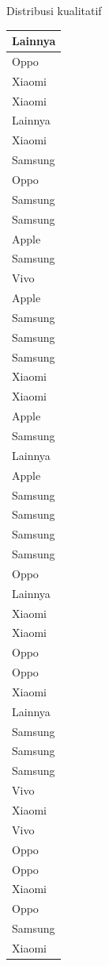\documentclass[
  ignorenonframetext,
]{beamer}
\begin{document}
\begin{frame}[s]{Distribusi kualitatif}
\begin{table}
\begin{tabular}[t]{l}
\hline
Lainnya\\
\hline
Oppo\\
\hline
Xiaomi\\
\hline
Xiaomi\\
\hline
Lainnya\\
\hline
Xiaomi\\
\hline
Samsung\\
\hline
Oppo\\
\hline
Samsung\\
\hline
Samsung\\
\hline
Apple\\
\hline
Samsung\\
\hline
Vivo\\
\hline
Apple\\
\hline
Samsung\\
\hline
Samsung\\
\hline
Samsung\\
\hline
Xiaomi\\
\hline
Xiaomi\\
\hline
Apple\\
\hline
Samsung\\
\hline
Lainnya\\
\hline
Apple\\
\hline
Samsung\\
\hline
Samsung\\
\hline
Samsung\\
\hline
Samsung\\
\hline
Oppo\\
\hline
Lainnya\\
\hline
Xiaomi\\
\hline
Xiaomi\\
\hline
Oppo\\
\hline
Oppo\\
\hline
Xiaomi\\
\hline
Lainnya\\
\hline
Samsung\\
\hline
Samsung\\
\hline
Samsung\\
\hline
Vivo\\
\hline
Xiaomi\\
\hline
Vivo\\
\hline
Oppo\\
\hline
Oppo\\
\hline
Xiaomi\\
\hline
Oppo\\
\hline
Samsung\\
\hline
Xiaomi\\

\end{tabular}
\end{table}
\end{frame}
\end{document}

